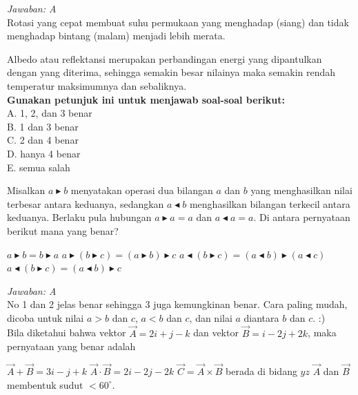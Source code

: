 \documentclass[11pt,fleqn]{exam}
\begin{document}
\begin{questions}
\textit{Jawaban: A}\\
Rotasi yang cepat membuat suhu permukaan yang menghadap (siang) dan tidak menghadap bintang (malam) menjadi lebih merata. 

Albedo atau reflektansi merupakan perbandingan energi yang dipantulkan dengan yang diterima, sehingga semakin besar nilainya maka semakin rendah temperatur maksimumnya dan sebaliknya.\\


\textbf{Gunakan petunjuk ini untuk menjawab soal-soal berikut:}\\
A. 1, 2, dan 3 benar\\
B. 1 dan 3 benar\\
C. 2 dan 4 benar\\
D. hanya 4 benar\\
E. semua salah\\

{%
\renewcommand*\thechoice{\arabic{choice}} 
%
\question Misalkan $a \blacktriangleright b$ menyatakan operasi dua bilangan $a$ dan $b$ yang menghasilkan nilai terbesar antara keduanya, sedangkan $a \blacktriangleleft b$ menghasilkan bilangan terkecil antara keduanya. Berlaku pula hubungan $a \blacktriangleright a = a$ dan $a \blacktriangleleft a = a$.
Di antara pernyataan berikut mana yang benar?
\begin{choices}
\choice $a \blacktriangleright b = b \blacktriangleright a$
\choice $a \blacktriangleright (b \blacktriangleright c) = (a \blacktriangleright b) \blacktriangleright c$
\choice $a \blacktriangleleft (b \blacktriangleright c) = (a \blacktriangleleft b) \blacktriangleright (a \blacktriangleleft c)$
\choice $a \blacktriangleleft (b \blacktriangleright c) = (a \blacktriangleleft b) \blacktriangleright c$
\end{choices}

\textit{Jawaban: A}\\
No 1 dan 2 jelas benar sehingga 3 juga kemungkinan benar.
Cara paling mudah, dicoba untuk nilai $a > b$ dan $c$,  $a <  b$ dan $c$, dan nilai $a$ diantara $b$ dan $c$. :)\\


\question Bila diketahui bahwa vektor $\overrightarrow{A} = 2i + j - k$ dan vektor $\overrightarrow{B} = i -2j + 2k$, maka pernyataan yang benar adalah
\begin{choices}
\choice $\overrightarrow{A} + \overrightarrow{B} = 3i - j + k$
\choice $\overrightarrow{A} \cdot \overrightarrow{B} = 2i - 2j - 2k$
\choice $\overrightarrow{C} = \overrightarrow{A} \times \overrightarrow{B}$ berada di bidang $yz$
\choice $\overrightarrow{A}$ dan $\overrightarrow{B}$ membentuk sudut $< 60^{\circ}$.
\end{choices}

}
\end{questions}
\end{document}
